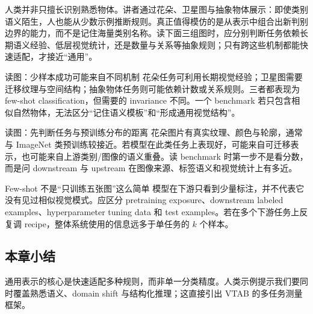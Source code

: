 人类并非只擅长识别熟悉物体。讲者通过花朵、卫星图与抽象物体展示：即使类别语义陌生，人也能从少数示例推断规则。真正值得模仿的是从表示中组合出新判别边界的能力，而不是记住海量类别名称。读下面三组图时，应分别判断任务依赖长期语义经验、低层视觉统计，还是数量与关系等抽象规则；只有跨这些机制都能快速适配，才接近“通用”。


\begin{knowledgebox}{读图：少样本成功可能来自不同机制}
花朵任务可利用长期视觉经验；卫星图需要迁移纹理与空间结构；抽象物体任务则可能依赖计数或关系规则。三者都表现为 few-shot classification，但需要的 invariance 不同。一个 benchmark 若只包含相似自然物体，无法区分“记住语义模板”和“形成通用视觉结构”。
\end{knowledgebox}


\begin{knowledgebox}{读图：先判断任务与预训练分布的距离}
花朵图片有真实纹理、颜色与轮廓，通常与 ImageNet 类预训练较接近。若模型在此类任务上表现好，可能来自可迁移表示，也可能来自上游类别/图像的语义重叠。读 benchmark 时第一步不是看分数，而是问 downstream 与 upstream 在图像来源、标签语义和视觉统计上有多近。
\end{knowledgebox}


\begin{warningbox}{Few-shot 不是“只训练五张图”这么简单}
模型在下游只看到少量标注，并不代表它没有见过相似视觉模式。应区分 pretraining exposure、downstream labeled examples、hyperparameter tuning data 和 test examples。若在多个下游任务上反复调 recipe，整体系统使用的信息远多于单任务的 $k$ 个样本。
\end{warningbox}

\subsection{本章小结}

通用表示的核心是快速适配多种规则，而非单一分类精度。人类示例提示我们要同时覆盖熟悉语义、domain shift 与结构化推理；这直接引出 VTAB 的多任务测量框架。

